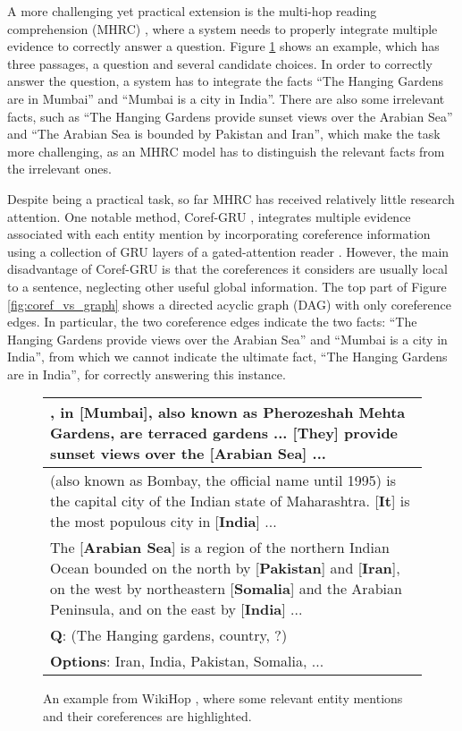 \documentclass[letterpaper]{article}
\begin{document}
A more challenging yet practical extension is the multi-hop reading comprehension (MHRC) \citep{welbl2018constructing}, where a system needs to properly integrate multiple evidence to correctly answer a question.
Figure \ref{fig:example} shows an example, which has three passages, a question and several candidate choices. 
In order to correctly answer the question, a system has to integrate the facts ``The Hanging Gardens are in Mumbai'' and ``Mumbai is a city in India''.
There are also some irrelevant facts, such as ``The Hanging Gardens provide sunset views over the Arabian Sea'' and ``The Arabian Sea is bounded by Pakistan and Iran'', which make the task more challenging, as an MHRC model has to distinguish the relevant facts from the irrelevant ones.


Despite being a practical task, so far MHRC has received relatively little research attention.
One notable method, Coref-GRU \citep{N18-2007}, integrates multiple evidence associated with each entity mention by incorporating coreference information using a collection of GRU layers of a gated-attention reader \citep{dhingra-EtAl:2017:Long2}.
However, the main disadvantage of Coref-GRU is that the coreferences it considers are usually local to a sentence, neglecting other useful global information.
The top part of Figure \ref{fig:coref_vs_graph} shows a directed acyclic graph (DAG) with only coreference edges. 
In particular, the two coreference edges indicate the two facts: ``The Hanging Gardens provide views over the Arabian Sea'' and ``Mumbai is a city in India'', from which we cannot indicate the ultimate fact, ``The Hanging Gardens are in India'', for correctly answering this instance.


\begin{figure} 
\begin{tabularx}{0.48\textwidth}{|X|}
\hline
[\textbf{The Hanging Gardens}], in [\textbf{Mumbai}], also known as Pherozeshah Mehta Gardens, are terraced gardens ... [\textbf{They}] provide sunset views over the [\textbf{Arabian Sea}] ... \\
\hline
\hline
[\textbf{Mumbai}] (also known as Bombay, the official name until 1995) is the capital city of the Indian state of Maharashtra. [\textbf{It}] is the most populous city in [\textbf{India}] ... \\
\hline
\hline
The [\textbf{Arabian Sea}] is a region of the northern Indian Ocean bounded 
on the north by [\textbf{Pakistan}] and [\textbf{Iran}], on the west by northeastern [\textbf{Somalia}] and the Arabian Peninsula, and on the east by [\textbf{India}] ... \\
\hline
\textbf{Q}: (The Hanging gardens, country, ?)  \\
\textbf{Options}:  {Iran, India, Pakistan, Somalia, ...} \\
\hline
\end{tabularx}
\vspace{-1.0em}
\caption{An example from WikiHop \citep{welbl2018constructing}, where some relevant entity mentions and their coreferences are highlighted.}
\label{fig:example}
\vspace{-1.6em}
\end{figure}
\end{document}
